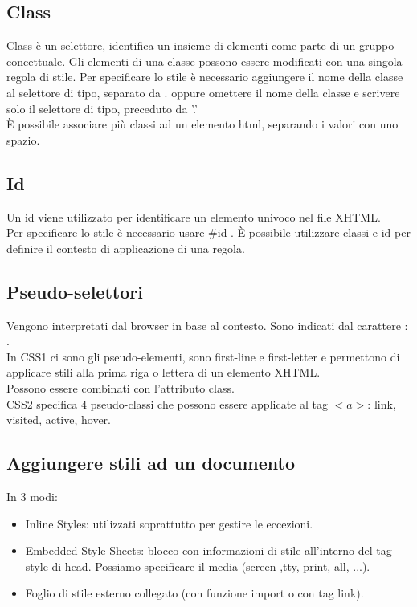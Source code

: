 \documentclass{article}
\begin{document}
\subsection{Class}
Class è un selettore, identifica un insieme di elementi come parte di un gruppo concettuale. Gli elementi di una classe possono essere modificati con una singola regola di stile. Per specificare lo stile è necessario aggiungere il nome della classe al selettore di tipo, separato da . oppure omettere il nome della classe e scrivere solo il selettore di tipo, preceduto da '.'\\
È possibile associare più classi ad un elemento html, separando i valori con uno spazio.
\subsection{Id}
Un id viene utilizzato per identificare un elemento univoco nel file XHTML. \\
Per specificare lo stile è necessario usare \#id . 
È possibile utilizzare classi e id per definire il contesto di applicazione di una regola. 
\subsection{Pseudo-selettori}
Vengono interpretati dal browser in base al contesto. Sono indicati dal carattere : .\\
In CSS1 ci sono gli pseudo-elementi, sono first-line e first-letter e permettono di applicare stili alla prima riga o lettera di un elemento XHTML.\\
Possono essere combinati con l'attributo class.\\
CSS2 specifica 4 pseudo-classi che possono essere applicate al tag $<a>$: link, visited, active, hover.
\subsection{Aggiungere stili ad un documento}
In 3 modi:
\begin{itemize}
	\item Inline Styles: utilizzati soprattutto per gestire le eccezioni.
	\item Embedded Style Sheets: blocco con informazioni di stile all'interno del tag style di head. Possiamo specificare il media (screen ,tty, print, all, ...).
	\item Foglio di stile esterno collegato (con funzione import o con tag link).
\end{itemize}
\end{document}
